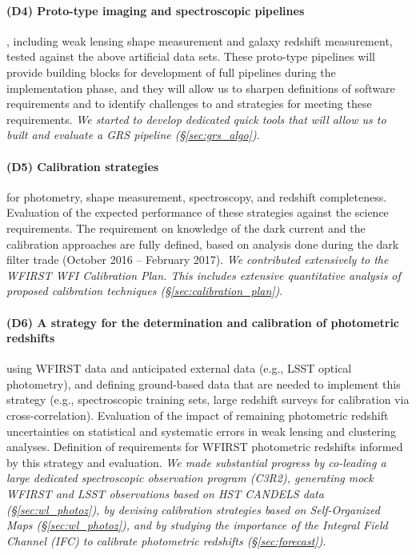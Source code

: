 \paragraph*{(D4) Proto-type imaging and spectroscopic pipelines}, including weak lensing shape measurement and galaxy redshift measurement, tested against the
above artificial data sets. These proto-type pipelines will provide
building blocks for development of full pipelines during the implementation
phase, and they will allow us to sharpen definitions of software
requirements and to identify challenges to and strategies for meeting
these requirements. \emph{We started to develop dedicated quick tools that will allow us to built and evaluate a GRS pipeline (\S \ref{sec:grs_algo})}.

\paragraph*{(D5) Calibration strategies} for photometry, shape measurement, spectroscopy, and redshift completeness. Evaluation of the expected performance of these strategies against the science requirements. The requirement on knowledge of the dark current and the calibration approaches are fully defined, based on analysis done during the dark filter trade (October 2016 -- February 2017). \emph{We contributed extensively to the WFIRST WFI Calibration Plan. This includes extensive quantitative analysis of proposed calibration techniques (\S \ref{sec:calibration_plan})}.

\paragraph*{(D6) A strategy for the determination and calibration of photometric redshifts} using WFIRST data and anticipated external data (e.g., LSST optical
photometry), and defining ground-based data that are needed to
implement this strategy (e.g., spectroscopic training sets, large
redshift surveys for calibration via cross-correlation).
Evaluation of the impact of remaining photometric redshift uncertainties
on statistical and systematic errors in weak lensing and clustering analyses.
Definition of requirements for WFIRST photometric redshifts informed
by this strategy and evaluation. \emph{We made substantial progress by co-leading a large dedicated spectroscopic observation program (C3R2), generating mock WFIRST and LSST observations based on HST CANDELS data (\S \ref{sec:wl_photoz}), by devising calibration strategies based on Self-Organized Maps (\S \ref{sec:wl_photoz}), and by studying the importance of the Integral Field Channel (IFC) to calibrate photometric redshifts (\S \ref{sec:forecast})}.

